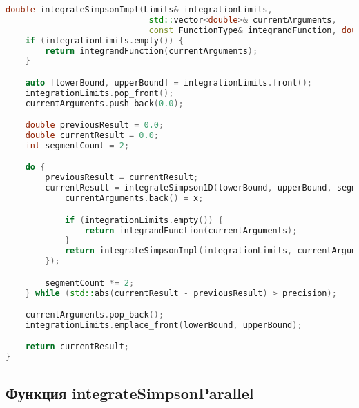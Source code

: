 \documentclass[12pt]{article}
\begin{document}
\begin{lstlisting}[language=C++]
double integrateSimpsonImpl(Limits& integrationLimits,
                             std::vector<double>& currentArguments,
                             const FunctionType& integrandFunction, double precision) {
    if (integrationLimits.empty()) {
        return integrandFunction(currentArguments);
    }

    auto [lowerBound, upperBound] = integrationLimits.front();
    integrationLimits.pop_front();
    currentArguments.push_back(0.0);

    double previousResult = 0.0;
    double currentResult = 0.0;
    int segmentCount = 2;

    do {
        previousResult = currentResult;
        currentResult = integrateSimpson1D(lowerBound, upperBound, segmentCount, [&](double x) {
            currentArguments.back() = x;

            if (integrationLimits.empty()) {
                return integrandFunction(currentArguments);
            }
            return integrateSimpsonImpl(integrationLimits, currentArguments, integrandFunction, precision);
        });

        segmentCount *= 2;
    } while (std::abs(currentResult - previousResult) > precision);

    currentArguments.pop_back();
    integrationLimits.emplace_front(lowerBound, upperBound);

    return currentResult;
}
\end{lstlisting}

\subsection*{Функция integrateSimpsonParallel}
\end{document}

